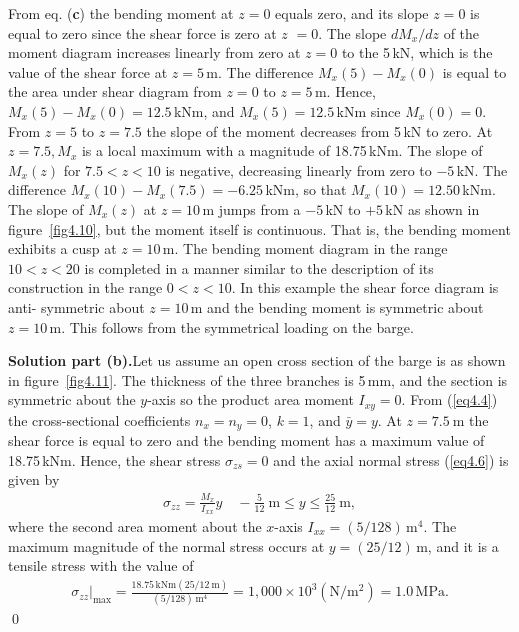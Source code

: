 \documentclass{AeroStructure-ERJohnson}
\begin{document}
\begin{example*}
From eq. (\textbf{c}) the bending moment at $z = 0$ equals zero, and its slope $z = 0$ is equal to zero since the shear force is zero at $\textit{z }= 0$. The slope $d M_{x}/d z$ of the moment diagram increases linearly from zero at $z = 0$ to the 5\,kN, which is the value of the shear force at $z = 5$\,m. The difference $\textit{M}_x(5) - \textit{M}_x(0)$ is equal to the area under shear diagram from $z = 0$ to $z = 5$\,m. Hence, $M_{x}(5) - M_{x}(0) = 12.5$\,kNm, and $M_{x}(5) = 12.5$\,kNm since $M_{x}(0) = 0$. From $z = 5$ to $z = 7.5$ the slope of the moment decreases from 5\,kN to zero. At $z = 7.5, M_{x}$ is a local maximum with a magnitude of 18.75\,kNm. The slope of $M_{x}(z)$ for $7.5 < z < 10$ is negative, decreasing linearly from zero to $-5$\,kN. The difference $M_{x}(10) - M_{x}(7.5) = -6.25$\,kNm, so that $M_{x}(10) = 12.50$\,kNm. The slope of $M_{x}(z)$ at $z = 10$\,m jumps from a $-5$\,kN to $+5$\,kN as shown in figure~\ref{fig4.10}, but the moment itself is continuous. That is, the bending moment exhibits a cusp at $z = 10$\,m. The bending moment diagram in the range $10 < z < 20$ is completed in a manner similar to the description of its construction in the range $0 < z < 10$. In this example the shear force diagram is anti- symmetric about $z = 10$\,m and the bending moment is symmetric about $z = 10$\,m. This follows from the symmetrical loading on the barge.



\noindent\textbf{Solution part (b).}\enspace Let us assume an open cross section of the barge is as shown in figure~\ref{fig4.11}. The thickness of the three branches is 5\,mm, and the section is symmetric about the $y$-axis so the product area moment $I_{x y}=0$. From (\ref{eq4.4}) the cross-sectional coefficients $n_{x}=n_{y}=0$, $k=1$, and $\bar{y}=y$. At $z=7.5~\mathrm{m}$ the shear force is equal to zero and the bending moment has a maximum value of 18.75\,kNm. Hence, the shear stress $\sigma_{z s}=0$ and the axial normal stress (\ref{eq4.6}) is given by
\begin{align}\label{ex4.2d}
\sigma_{z z}=\frac{M_{x}}{I_{x x}} y \quad-\frac{5}{12}~\mathrm{m} \leq y \leq \frac{25}{12}~\mathrm{m},
\end{align}
where the second area moment about the $x$-axis $I_{x x}=(5/128)\,\mathrm{m}^{4}$. The maximum magnitude of the normal stress occurs at $y=(25/12)\,\mathrm{m}$, and it is a tensile stress with the value of
\begin{align}\label{ex4.2e}
\left.\sigma_{z z}\right|_{\max }=\frac{18.75\,\textrm{kNm}(25/12~\mathrm{m})}{(5/128)\,\mathrm{m}^{4}}=1{,}000 \times 10^{3}(\mathrm{N}/\mathrm{m}^{2})=1.0\,\textrm{MPa}.
\end{align}\hfill\qed
\end{example*}
\end{document}
